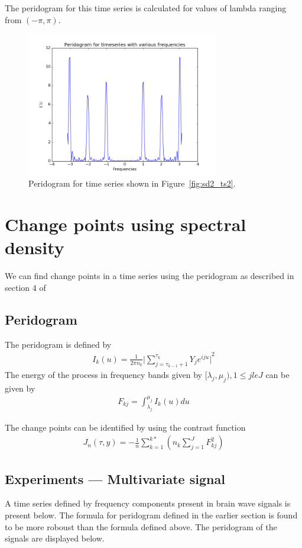 \documentclass{article}
\begin{document}
The peridogram for this time series is calculated for values of lambda ranging from $(-\pi, \pi)$.

\begin{figure}[ht!]
  \centering
  \includegraphics[width=0.75\textwidth]{images/spectral_density_2/peri2}
  \caption{Peridogram for time series shown in Figure~\ref{fig:sd2_ts2}.\label{fig:sd2_peri2}}
\end{figure}

\section{Change points using spectral density}
We can find change points in a time series using the peridogram as described in section 4 of~\cite{lavielle2005using}

\subsection{Peridogram}
The peridogram is defined by 
\begin{align}
  I_{k}(u) = \frac{1}{2\pi n_{k}} {\lvert \sum_{j = \tau_{k-1}+1}^{\tau_{k}} Y_{j} e^{iju} \rvert }^{2}
\end{align}
The energy of the process in frequency bands given by $[\lambda_{j}, \mu_{j}), 1 \le j le J $ can be given by 
\begin{align}
  F_{kj} = \int_{\lambda_{j}}^{\mu_{j}} I_{k}(u) du
\end{align}

The change points can be identified by using the contrast function
\begin{align}
  J_{n}(\tau, y) = -\frac{1}{n} \sum_{k=1}^{k*} (n_{k} \sum_{j=1}^{J} F^{2}_{kj})
\end{align}

\subsection{Experiments --- Multivariate signal}
A time series defined by frequency components present in brain wave signals is present below.  The formula for peridogram defined in the earlier section is found to be more roboust than the formula defined above.  The peridogram of the signals are displayed below.
\end{document}
